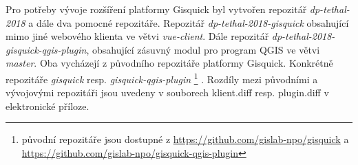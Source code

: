 \newpage
Pro potřeby vývoje rozšíření platformy Gisquick byl vytvořen repozitář 
\textit{dp-tethal-2018} a dále dva pomocné repozitáře. 
Repozitář \textit{dp-tethal-2018-gisquick}
obsahující mimo jiné webového klienta ve větvi \textit{vue-client}.
Dále repozitář \textit{dp-tethal-2018-gisquick-qgis-plugin}, obsahující zásuvný 
modul pro program QGIS ve větvi \textit{master}.
Oba vycházejí z původního repozitáře platformy Gisquick. Konkrétně 
repozitáře \textit{gisquick} resp. \textit{gisquick-qgis-plugin}
\footnote{původní repozitáře jsou dostupné z \url{https://github.com/gislab-npo/gisquick} a \newline \url{https://github.com/gislab-npo/gisquick-qgis-plugin}}
.
\newline
Rozdíly mezi původními a vývojovými repozitáři jsou uvedeny v 
souborech klient.diff resp. plugin.diff v elektronické příloze. 

